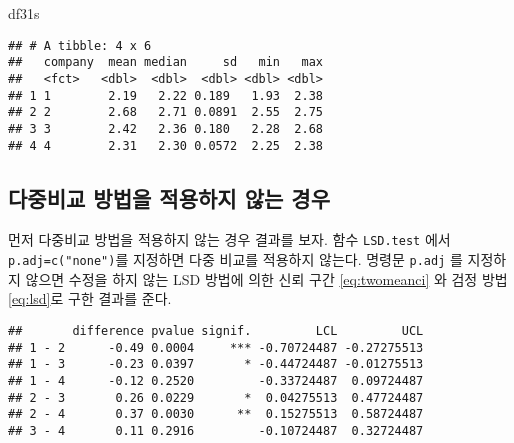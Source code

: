 \documentclass[
]{book}
\newenvironment{Shaded}{\begin{snugshade}}{\end{snugshade}}
\newcommand{\AttributeTok}[1]{\textcolor[rgb]{0.77,0.63,0.00}{#1}}
\newcommand{\CommentTok}[1]{\textcolor[rgb]{0.56,0.35,0.01}{\textit{#1}}}
\newcommand{\ConstantTok}[1]{\textcolor[rgb]{0.00,0.00,0.00}{#1}}
\newcommand{\FloatTok}[1]{\textcolor[rgb]{0.00,0.00,0.81}{#1}}
\newcommand{\FunctionTok}[1]{\textcolor[rgb]{0.00,0.00,0.00}{#1}}
\newcommand{\NormalTok}[1]{#1}
\newcommand{\OtherTok}[1]{\textcolor[rgb]{0.56,0.35,0.01}{#1}}
\newcommand{\SpecialCharTok}[1]{\textcolor[rgb]{0.00,0.00,0.00}{#1}}
\newcommand{\StringTok}[1]{\textcolor[rgb]{0.31,0.60,0.02}{#1}}
\begin{document}
\begin{Shaded}
\begin{Highlighting}[]
\NormalTok{df31s}
\end{Highlighting}
\end{Shaded}

\begin{verbatim}
## # A tibble: 4 x 6
##   company  mean median     sd   min   max
##   <fct>   <dbl>  <dbl>  <dbl> <dbl> <dbl>
## 1 1        2.19   2.22 0.189   1.93  2.38
## 2 2        2.68   2.71 0.0891  2.55  2.75
## 3 3        2.42   2.36 0.180   2.28  2.68
## 4 4        2.31   2.30 0.0572  2.25  2.38
\end{verbatim}

\hypertarget{uxb2e4uxc911uxbe44uxad50-uxbc29uxbc95uxc744-uxc801uxc6a9uxd558uxc9c0-uxc54auxb294-uxacbduxc6b0}{%
\subsection{다중비교 방법을 적용하지 않는 경우}\label{uxb2e4uxc911uxbe44uxad50-uxbc29uxbc95uxc744-uxc801uxc6a9uxd558uxc9c0-uxc54auxb294-uxacbduxc6b0}}

먼저 다중비교 방법을 적용하지 않는 경우 결과를 보자. 함수 \texttt{LSD.test}
에서 \texttt{p.adj=c("none")}를 지정하면 다중 비교를 적용하지 않는다. 명령문
\texttt{p.adj} 를 지정하지 않으면 수정을 하지 않는 LSD 방법에 의한 신뢰 구간
\eqref{eq:twomeanci} 와 검정 방법 \eqref{eq:lsd}로 구한 결과를 준다.

\begin{Shaded}
\end{Shaded}

\begin{verbatim}
##       difference pvalue signif.         LCL         UCL
## 1 - 2      -0.49 0.0004     *** -0.70724487 -0.27275513
## 1 - 3      -0.23 0.0397       * -0.44724487 -0.01275513
## 1 - 4      -0.12 0.2520         -0.33724487  0.09724487
## 2 - 3       0.26 0.0229       *  0.04275513  0.47724487
## 2 - 4       0.37 0.0030      **  0.15275513  0.58724487
## 3 - 4       0.11 0.2916         -0.10724487  0.32724487
\end{verbatim}
\end{document}
